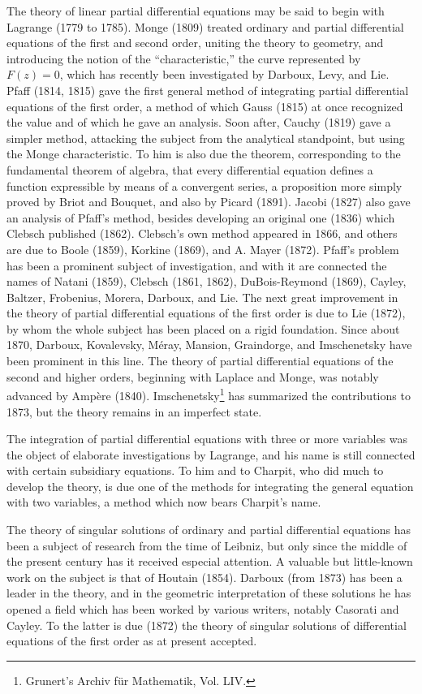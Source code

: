\documentclass[oneside]{book}
\begin{document}
{The theory of linear partial differential equations may be said to
begin with Lagrange (1779 to 1785). Monge (1809) treated ordinary
and partial differential equations of the first and second order,
uniting the theory to geometry, and introducing the notion of the
``characteristic,'' the curve represented by $F(z) = 0$, which has
recently been investigated by Darboux, Levy, and Lie. Pfaff (1814,
1815) gave the first general method of integrating partial
differential equations of the first order, a method of which Gauss
(1815) at once recognized the value and of which he gave an
analysis. Soon after, Cauchy (1819) gave a simpler method, attacking
the subject from the analytical standpoint, but using the Monge
characteristic. To him is also due the theorem, corresponding to the
fundamental theorem of algebra, that every differential equation
defines a function expressible by means of a convergent series, a
proposition more simply proved by Briot and Bouquet, and also by
Picard (1891). Jacobi (1827) also gave an analysis of Pfaff's
method, besides developing an original one (1836) which Clebsch
published (1862). Clebsch's own method appeared in 1866, and others
are due to Boole (1859), Korkine (1869), and A. Mayer
(1872). Pfaff's problem has been a prominent subject of
investigation, and with it are connected the names of Natani (1859),
Clebsch (1861, 1862), DuBois-Reymond (1869), Cayley, Baltzer,
Frobenius, Morera, Darboux, and Lie. The next great improvement in
the theory of partial differential equations of the first order is
due to Lie (1872), by whom the whole subject has been placed on a
rigid foundation. Since about 1870, Darboux, Kovalevsky, M\'eray,
Mansion, Graindorge, and Imschenetsky have been prominent in this
line. The theory of partial differential equations of the second
and higher orders, beginning with Laplace and Monge, was notably
advanced by Amp\`ere (1840). Imschenetsky\footnote{Grunert's Archiv
f\"ur Mathematik, Vol. LIV.} has summarized the contributions to
1873, but the theory remains in an imperfect state.

The integration of partial differential equations with three or more
variables was the object of elaborate investigations by Lagrange,
and his name is still connected with certain subsidiary
equations. To him and to Charpit, who did much to develop the
theory, is due one of the methods for integrating the general
equation with two variables, a method which now bears Charpit's name.

The theory of singular solutions of ordinary and partial
differential equations has been a subject of research from the time
of Leibniz, but only since the middle of the present century has it
received especial attention. A valuable but little-known work on the
subject is that of Houtain (1854). Darboux (from 1873) has been a
leader in the theory, and in the geometric interpretation of these
solutions he has opened a field which has been worked by various
writers, notably Casorati and Cayley. To the latter is due (1872)
the theory of singular solutions of differential equations of the
first order as at present accepted.

}
\end{document}
